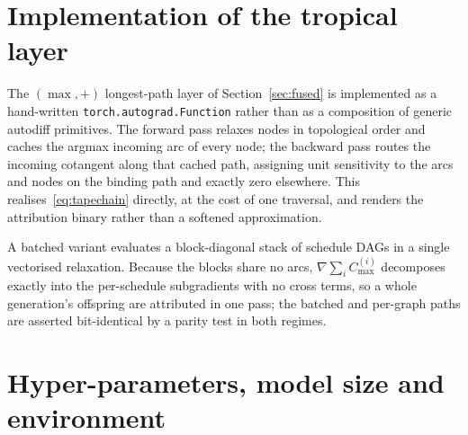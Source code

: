 \documentclass[11pt]{article}
\newcommand{\Cmax}{C_{\max}}
\begin{document}
\appendix

\section{Implementation of the tropical layer}
\label{app:impl}
The $(\max,+)$ longest-path layer of Section~\ref{sec:fused} is implemented as a
hand-written \texttt{torch.\allowbreak autograd.\allowbreak Function} rather than as a composition of generic
autodiff primitives. The forward pass relaxes nodes in topological order and caches
the argmax incoming arc of every node; the backward pass routes the incoming cotangent
along that cached path, assigning unit sensitivity to the arcs and nodes on the binding
path and exactly zero elsewhere. This realises~\eqref{eq:tapechain} directly, at the cost
of one traversal, and renders the attribution binary rather than a softened
approximation.

A batched variant evaluates a block-diagonal stack of schedule DAGs in a single
vectorised relaxation. Because the blocks share no arcs,
$\nabla \sum_i \Cmax^{(i)}$ decomposes exactly into the per-schedule subgradients with no
cross terms, so a whole generation's offspring are attributed in one pass; the batched
and per-graph paths are asserted bit-identical by a parity test in both regimes.

\section{Hyper-parameters, model size and environment}
\label{app:repro}
\end{document}
